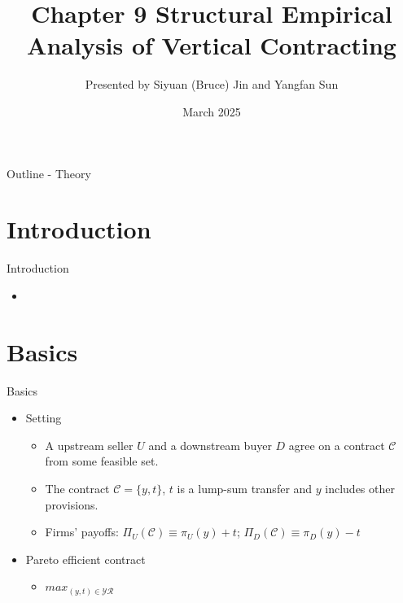 \documentclass[aspectratio=169]{beamer}  %
\title{Chapter 9 Structural Empirical Analysis of Vertical Contracting}
\author{Presented by Siyuan (Bruce) Jin and Yangfan Sun}
\institute{Hong Kong University of Science and Technology}
\date{March 2025}
\begin{document}
\begin{frame}[plain]
    \titlepage
\end{frame}

\begin{frame}{Outline - Theory}
    \tableofcontents
\end{frame}

\section{Introduction}
\begin{frame}{Introduction}
    \begin{itemize}
        \item 
    \end{itemize}
\end{frame}

\section{Basics}
\begin{frame}{Basics}
    \begin{itemize}
        \item Setting \vspace{.2cm}
        \begin{itemize}
            \item A upstream seller $U$ and a downstream buyer $D$ agree on a contract $\mathcal{C}$ from some feasible set. \vspace{.2cm}
            \item The contract $\mathcal{C} = \{y, t\}$, $t$ is a lump-sum transfer and $y$ includes other provisions. \vspace{.2cm}
            \item Firms' payoffs: $\Pi_U(\mathcal{C})\equiv \pi_U(y) + t$; $\Pi_D(\mathcal{C})\equiv \pi_D(y) - t$ \vspace{.2cm}
        \end{itemize}
        \item Pareto efficient contract \vspace{.2cm}
        \begin{itemize}
            \item $max_{(y,t)\in \mathcal{Y}\mathcal{R}}$
        \end{itemize}
    \end{itemize}
\end{frame}
\end{document}
